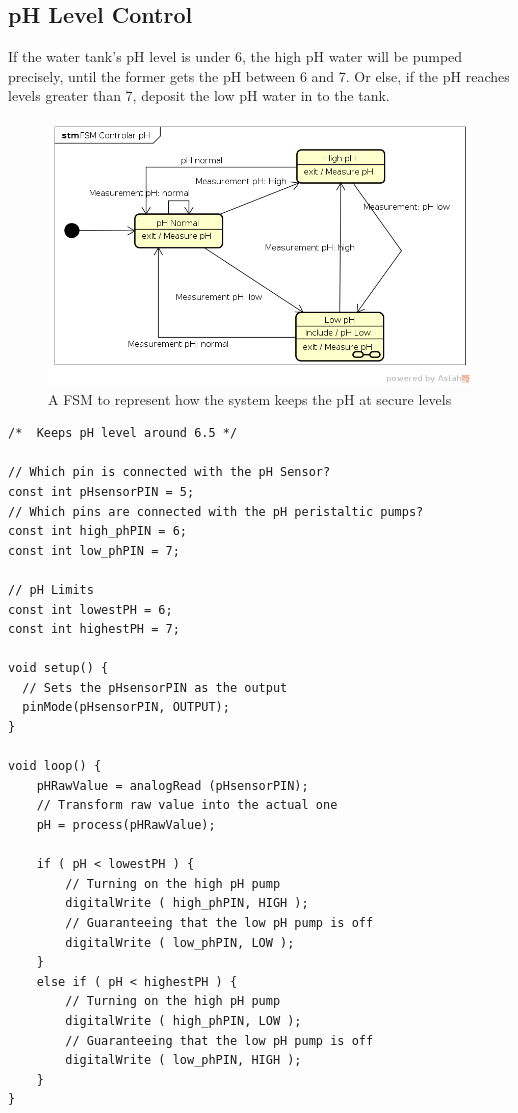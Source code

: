 \subsection{pH Level Control}
    If the water tank's pH level is under 6,
    the high pH water will be pumped precisely,
    until the former gets the pH between 6 and 7.
    Or else,
    if the pH reaches levels greater than 7,
    deposit the low pH water in to the tank.

    \begin{figure}[h]
        \centering
        \includegraphics[width=.7\textwidth]{diagrams/pH_Control}
        \caption{A FSM to represent how the system keeps the pH at secure levels}
        \label{fig:fsm_pHc}
    \end{figure}

\begin{lstlisting}[style=Arduino, caption=pH Control First Code, label=lst:ph1]
 /*  Keeps pH level around 6.5 */

// Which pin is connected with the pH Sensor?
const int pHsensorPIN = 5;
// Which pins are connected with the pH peristaltic pumps?
const int high_phPIN = 6;
const int low_phPIN = 7;

// pH Limits
const int lowestPH = 6;
const int highestPH = 7;

void setup() {
  // Sets the pHsensorPIN as the output
  pinMode(pHsensorPIN, OUTPUT);
}

void loop() {
    pHRawValue = analogRead (pHsensorPIN);
    // Transform raw value into the actual one
    pH = process(pHRawValue);

    if ( pH < lowestPH ) {
        // Turning on the high pH pump
        digitalWrite ( high_phPIN, HIGH );
        // Guaranteeing that the low pH pump is off
        digitalWrite ( low_phPIN, LOW );
    }
    else if ( pH < highestPH ) {
        // Turning on the high pH pump
        digitalWrite ( high_phPIN, LOW );
        // Guaranteeing that the low pH pump is off
        digitalWrite ( low_phPIN, HIGH );
    }
}
\end{lstlisting}

